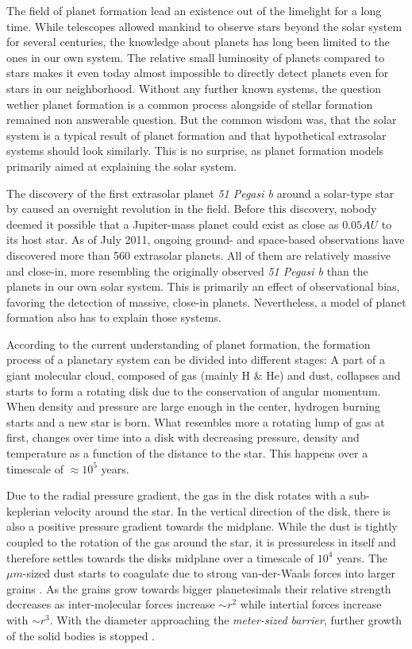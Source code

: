 The field of planet formation lead an existence out of the limelight for a long time. While telescopes allowed mankind to observe stars beyond the solar system for several centuries, the knowledge about planets has long been limited to the ones in our own system. The relative small luminosity of planets compared to stars makes it even today almost impossible to directly detect planets even for stars in our neighborhood. Without any further known systems, the question wether planet formation is a common process alongside of stellar formation remained non answerable question. But the common wisdom was, that the solar system is a typical result of planet formation and that hypothetical extrasolar systems should look similarly. This is no surprise, as planet formation models primarily aimed at explaining the solar system.

The discovery of the first extrasolar planet \emph{51 Pegasi b} around a solar-type star by \cite{1995Natur.378..355M} caused an overnight revolution in the field. 
Before this discovery, nobody deemed it possible that a Jupiter-mass planet could exist as close as $0.05 AU$ to its host star. As of July 2011, ongoing ground- and space-based observations have discovered more than 560 extrasolar planets. All of them are relatively massive and close-in, more resembling the originally observed \emph{51 Pegasi b} than the planets in our own solar system. This is primarily an effect of observational bias, favoring the detection of massive, close-in planets. Nevertheless, a model of planet formation also has to explain those systems.

According to the current understanding of planet formation, the formation process of a planetary system can be divided into different stages: A part of a giant molecular cloud, composed of gas (mainly H \& He) and dust, collapses and starts to form a rotating disk due to the conservation of angular momentum. When density and pressure are large enough in the center, hydrogen burning starts and a new star is born. What resembles more a rotating lump of gas at first, changes over time into a disk with decreasing pressure, density and temperature as a function of the distance to the star. This happens over a timescale of $\approx 10^5$ years.


Due to the radial pressure gradient, the gas in the disk rotates with a sub-keplerian velocity around the star. In the vertical direction of the disk, there is also a positive pressure gradient towards the midplane. While the dust is tightly coupled to the rotation of the gas around the star, it is pressureless in itself and therefore settles towards the disks midplane over a timescale of $10^4$ years. The $\mu m$-sized dust starts to coagulate due to strong van-der-Waals forces into larger grains \citep{2010A&A...513A..56G}. As the grains grow towards bigger planetesimals their relative strength decreases as inter-molecular forces increase $\sim r^2$ while intertial forces increase with $\sim r^3$. With the diameter approaching the \emph{meter-sized barrier}, further growth of the solid bodies is stopped \citep{Benz1999Icar..142....5B}.

